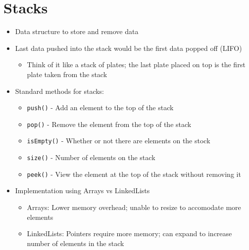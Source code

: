 \documentclass{article}
\begin{document}
\section{Stacks}
\begin{itemize}
    \item Data structure to store and remove data
    \item Last data pushed into the stack would be the first data popped off (LIFO)
        \begin{itemize}
            \item Think of it like a stack of plates; the last plate placed on top is the first plate taken from the stack
        \end{itemize}
    \item Standard methods for stacks:
        \begin{itemize}
            \item \verb|push()| - Add an element to the top of the stack
            \item \verb|pop()| - Remove the element from the top of the stack
            \item \verb|isEmpty()| - Whether or not there are elements on the stock
            \item \verb|size()| - Number of elements on the stack
            \item \verb|peek()| - View the element at the top of the stack without removing it
        \end{itemize}
    \item Implementation using Arrays vs LinkedLists
        \begin{itemize}
            \item Arrays: Lower memory overhead; unable to resize to accomodate more elements
            \item LinkedLists: Pointers require more memory; can expand to increase number of elements in the stack
        \end{itemize}
\end{itemize}
\end{document}
